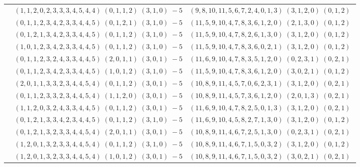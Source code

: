 \documentclass[11pt]{article}
\begin{document}
\begin{longtable}[l]{|c|c|c|}
 \cline{2-3} 
 & $(1 ,1 ,2 ,0 ,2 ,3 ,3 ,3 ,4 ,5 ,4 ,4) \;(0 ,1 ,1 ,2) \;(3 ,1 ,0) \;-5$ & $(9 ,8 ,10 ,11 ,5 ,6 ,7 ,2 ,4 ,0 ,1 ,3) \;(3 ,1 ,2 ,0) \;(0 ,1 ,2) \;$\\ 
 \cline{2-3} 
 & $(0 ,1 ,1 ,2 ,3 ,4 ,2 ,3 ,3 ,4 ,4 ,5) \;(0 ,1 ,2 ,1) \;(3 ,1 ,0) \;-5$ & $(11 ,5 ,9 ,10 ,4 ,7 ,8 ,3 ,6 ,1 ,2 ,0) \;(2 ,1 ,3 ,0) \;(0 ,1 ,2) \;$\\ 
 \cline{2-3} 
 & $(0 ,1 ,2 ,1 ,3 ,4 ,2 ,3 ,3 ,4 ,4 ,5) \;(0 ,1 ,1 ,2) \;(3 ,1 ,0) \;-5$ & $(11 ,5 ,9 ,10 ,4 ,7 ,8 ,2 ,6 ,1 ,3 ,0) \;(3 ,1 ,2 ,0) \;(0 ,1 ,2) \;$\\ 
 \cline{2-3} 
 & $(1 ,0 ,1 ,2 ,3 ,4 ,2 ,3 ,3 ,4 ,4 ,5) \;(0 ,1 ,1 ,2) \;(3 ,1 ,0) \;-5$ & $(11 ,5 ,9 ,10 ,4 ,7 ,8 ,3 ,6 ,0 ,2 ,1) \;(3 ,1 ,2 ,0) \;(0 ,1 ,2) \;$\\ 
 \cline{2-3} 
 & $(0 ,1 ,1 ,2 ,3 ,2 ,4 ,3 ,3 ,4 ,4 ,5) \;(2 ,0 ,1 ,1) \;(3 ,0 ,1) \;-5$ & $(11 ,6 ,9 ,10 ,4 ,7 ,8 ,3 ,5 ,1 ,2 ,0) \;(0 ,2 ,3 ,1) \;(0 ,2 ,1) \;$\\ 
 \cline{2-3} 
 & $(0 ,1 ,1 ,2 ,3 ,4 ,2 ,3 ,3 ,4 ,4 ,5) \;(1 ,0 ,1 ,2) \;(3 ,1 ,0) \;-5$ & $(11 ,5 ,9 ,10 ,4 ,7 ,8 ,3 ,6 ,1 ,2 ,0) \;(3 ,0 ,2 ,1) \;(0 ,1 ,2) \;$\\ 
 \cline{2-3} 
 & $(2 ,0 ,1 ,1 ,3 ,3 ,2 ,3 ,4 ,4 ,5 ,4) \;(0 ,1 ,1 ,2) \;(3 ,0 ,1) \;-5$ & $(10 ,8 ,9 ,11 ,4 ,5 ,7 ,0 ,6 ,2 ,3 ,1) \;(3 ,1 ,2 ,0) \;(0 ,2 ,1) \;$\\ 
 \cline{2-3} 
 & $(0 ,1 ,1 ,2 ,3 ,3 ,2 ,3 ,4 ,4 ,5 ,4) \;(1 ,1 ,2 ,0) \;(3 ,0 ,1) \;-5$ & $(10 ,8 ,9 ,11 ,4 ,5 ,7 ,3 ,6 ,1 ,2 ,0) \;(2 ,0 ,1 ,3) \;(0 ,2 ,1) \;$\\ 
 \cline{2-3} 
 & $(1 ,1 ,2 ,0 ,3 ,2 ,4 ,3 ,3 ,4 ,4 ,5) \;(0 ,1 ,1 ,2) \;(3 ,0 ,1) \;-5$ & $(11 ,6 ,9 ,10 ,4 ,7 ,8 ,2 ,5 ,0 ,1 ,3) \;(3 ,1 ,2 ,0) \;(0 ,2 ,1) \;$\\ 
 \cline{2-3} 
 & $(0 ,1 ,2 ,1 ,3 ,3 ,4 ,2 ,3 ,4 ,4 ,5) \;(0 ,1 ,1 ,2) \;(3 ,1 ,0) \;-5$ & $(11 ,6 ,9 ,10 ,4 ,5 ,8 ,2 ,7 ,1 ,3 ,0) \;(3 ,1 ,2 ,0) \;(0 ,1 ,2) \;$\\ 
 \cline{2-3} 
 & $(0 ,1 ,2 ,1 ,3 ,2 ,3 ,3 ,4 ,4 ,5 ,4) \;(2 ,0 ,1 ,1) \;(3 ,0 ,1) \;-5$ & $(10 ,8 ,9 ,11 ,4 ,6 ,7 ,2 ,5 ,1 ,3 ,0) \;(0 ,2 ,3 ,1) \;(0 ,2 ,1) \;$\\ 
 \cline{2-3} 
 & $(1 ,2 ,0 ,1 ,3 ,2 ,3 ,3 ,4 ,4 ,5 ,4) \;(0 ,1 ,1 ,2) \;(3 ,1 ,0) \;-5$ & $(10 ,8 ,9 ,11 ,4 ,6 ,7 ,1 ,5 ,0 ,3 ,2) \;(3 ,1 ,2 ,0) \;(0 ,1 ,2) \;$\\ 
 \cline{2-3} 
 & $(1 ,2 ,0 ,1 ,3 ,2 ,3 ,3 ,4 ,4 ,5 ,4) \;(1 ,0 ,1 ,2) \;(3 ,0 ,1) \;-5$ & $(10 ,8 ,9 ,11 ,4 ,6 ,7 ,1 ,5 ,0 ,3 ,2) \;(3 ,0 ,2 ,1) \;(0 ,2 ,1) \;$\\ 

\end{longtable}
\end{document}
